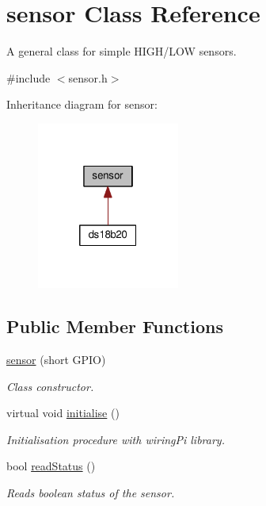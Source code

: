 \hypertarget{classsensor}{}\section{sensor Class Reference}
\label{classsensor}


A general class for simple H\+I\+G\+H/\+L\+OW sensors.  




{\ttfamily \#include $<$sensor.\+h$>$}



Inheritance diagram for sensor\+:\nopagebreak
\begin{figure}[H]
\begin{center}
\leavevmode
\includegraphics[width=133pt]{classsensor__inherit__graph}
\end{center}
\end{figure}
\subsection*{Public Member Functions}
\begin{DoxyCompactItemize}
\item 
\mbox{\hyperlink{classsensor_a3341a98b9c6b4f0e0234f205941f4342}{sensor}} (short G\+P\+IO)
\begin{DoxyCompactList}\small\item\em Class constructor. \end{DoxyCompactList}\item 
\mbox{\label{classsensor_ae1073389f46dd119e2f421a894b7d781}} 
virtual void \mbox{\hyperlink{classsensor_ae1073389f46dd119e2f421a894b7d781}{initialise}} ()
\begin{DoxyCompactList}\small\item\em Initialisation procedure with wiring\+Pi library. \end{DoxyCompactList}\item 
\mbox{\label{classsensor_a111c7b59fb50d61c0e44e689b8eb94f9}} 
bool \mbox{\hyperlink{classsensor_a111c7b59fb50d61c0e44e689b8eb94f9}{read\+Status}} ()
\begin{DoxyCompactList}\small\item\em Reads boolean status of the sensor. \end{DoxyCompactList}\end{DoxyCompactItemize}
